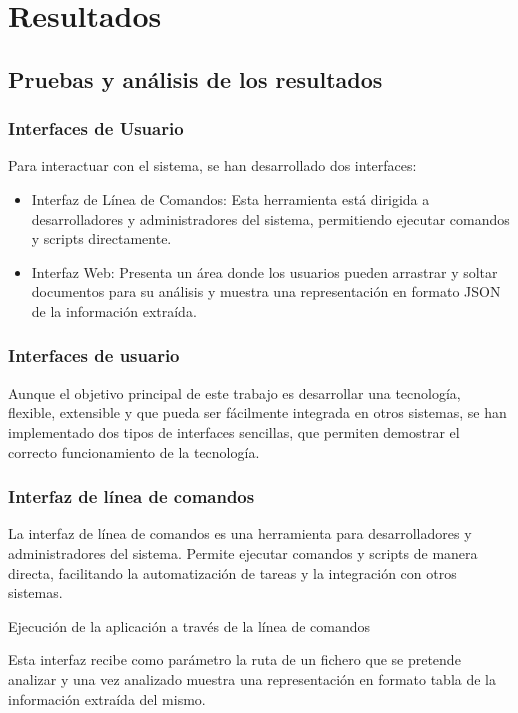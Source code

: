 \chapter{Resultados}\label{ch:chapter_5}


\section{Pruebas y análisis de los resultados}
\subsection*{Interfaces de Usuario}
Para interactuar con el sistema, se han desarrollado dos interfaces:

\begin{itemize}
    \item Interfaz de Línea de Comandos: Esta herramienta está dirigida a desarrolladores y
    administradores del sistema, permitiendo ejecutar comandos y scripts directamente.


    \item Interfaz Web: Presenta un área donde los usuarios pueden
    arrastrar y soltar documentos para su análisis y muestra una representación en formato JSON de la información
    extraída.
\end{itemize}


\subsection*{Interfaces de usuario}
Aunque el objetivo principal de este trabajo es desarrollar una tecnología, flexible, extensible y que pueda ser
fácilmente integrada en otros sistemas, se han implementado dos tipos de interfaces sencillas, que permiten demostrar el
correcto funcionamiento de la tecnología.

\subsection*{Interfaz de línea de comandos}
La interfaz de línea de comandos es una herramienta para desarrolladores y administradores del sistema. Permite ejecutar
comandos y scripts de manera directa, facilitando la automatización de tareas y la integración con otros sistemas.


Ejecución de la aplicación a través de la línea de comandos

Esta interfaz recibe como parámetro la ruta de un fichero que se pretende analizar y una vez analizado muestra una
representación en formato tabla de la información extraída del mismo.

